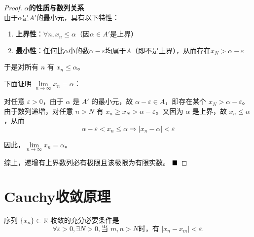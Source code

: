 \begin{proof}
            \textbf{$\alpha$的性质与数列关系}\\
            由于$\alpha$是$A'$的最小元，具有以下特性：
            \begin{enumerate}
                \item \textbf{上界性}：$\forall n, x_n \leq \alpha$（因$\alpha \in A'$是上界）
                \item \textbf{最小性}：任何比$\alpha$小的数$\alpha - \varepsilon$均属于$A$（即不是上界），从而存在$x_N > \alpha - \varepsilon$
            \end{enumerate}
        于是对所有 $n$ 有 $x_n \leq \alpha$。
        
        下面证明 $\lim\limits_{n \to \infty} x_n = \alpha$：
        
        对任意 $\varepsilon > 0$，由于 $\alpha$ 是 $A'$ 的最小元，故 $\alpha - \varepsilon \in A$，即存在某个 $x_N > \alpha - \varepsilon$。由于数列递增，对任意 $n > N$ 有 $x_n \geq x_N > \alpha - \varepsilon$。又因为 $\alpha$ 是上界，故 $x_n \leq \alpha$，从而
        $$
        \alpha - \varepsilon < x_n \leq \alpha \Rightarrow |x_n - \alpha| < \varepsilon
        $$
        
        因此，$\lim\limits_{n \to \infty} x_n = \alpha$。
        
        综上，递增有上界数列必有极限且该极限为有限实数。    $\hfill\blacksquare$
    \end{proof}
    


\newpage
\section{Cauchy收敛原理}

\begin{theorem*}[Cauchy收敛原理]
    序列 \(\{x_n\} \subset \mathbb{R}\) 收敛的充分必要条件是
    \[
    \forall \varepsilon > 0, \exists N > 0, \text{当 } m, n > N \text{时，有 } |x_n - x_m| < \varepsilon.
    \]
\end{theorem*}

